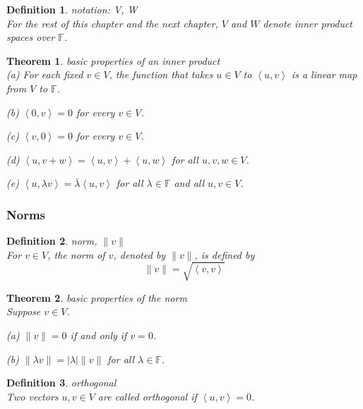 \documentclass{article}
\newtheorem{theorem}{Theorem}[subsection]
\newtheorem{definition}{Definition}[subsection]
\newcommand{\FF}{\mathbb{F}}
\begin{document}
\begin{CJK}{UTF8}{gkai}
\begin{definition}
    notation: V, W\\

    For the rest of this chapter and the next chapter, $V$ and $W$ denote inner product spaces over $\FF$.
\end{definition}

\begin{theorem}
    basic properties of an inner product\\

    (a) For each fixed $v \in V$, the function that takes $u \in V$ to $\left<u,v\right>$ is a linear map from $V$ to $\FF$.

    (b) $\left<0,v\right> = 0$ for every $v \in V$.

    (c) $\left<v,0\right> = 0$ for every $v \in V$.

    (d) $\left<u,v + w\right> = \left<u,v\right>+\left<u,w\right>$ for all $u,v,w \in V$.

    (e) $\left<u, \lambda v\right> = \bar{\lambda}\left<u,v\right>$ for all $\lambda \in \FF$ and all $u,v \in V$.
    
\end{theorem}
\subsubsection{Norms}

\begin{definition}
    norm, $\|v\|$\\

    For $v \in V$, the norm of $v$, denoted by $\|v\|$, is defined by
    \[\|v\| = \sqrt{\left<v,v\right>}\]
\end{definition}

\begin{theorem}
    basic properties of the norm\\

    Suppose $v \in V$.

    (a) $\|v\| = 0$ if and only if $v = 0$.

    (b) $\|\lambda v\| = |\lambda|\|v\|$ for all $\lambda \in \FF$.
\end{theorem}

\begin{definition}
    orthogonal\\

    Two vectors $u,v \in V$ are called orthogonal if $\left<u,v\right> = 0$.
\end{definition}


\end{CJK}
\end{document}
